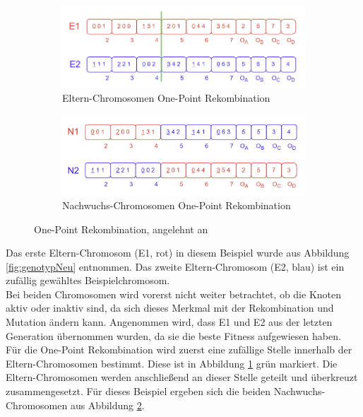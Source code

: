 \begin{figure}[H]
	\centering
	\begin{subfigure}[b]{\textwidth}
		\centering
		\includegraphics[scale = 0.77]{Bilder/BeispielOnePointCrossover.png}
		\caption{Eltern-Chromosomen One-Point Rekombination}
		\label{fig:onePointCrossoverEltern}
	\end{subfigure}
	
	\hfill
	
	\begin{subfigure}[b]{\textwidth}
		\centering
		\includegraphics[scale = 0.55]{Bilder/BeispielOnePointCrossover2.png}
		\caption{Nachwuchs-Chromosomen One-Point Rekombination}
		\label{fig:onePointCrossoverNachwuchs}
	\end{subfigure}
	\caption{One-Point Rekombination, angelehnt an \cite{torabi_using_2022}}
	\label{fig:onePointGesamt}
\end{figure}

Das erste Eltern-Chromosom (E1, rot) in diesem Beispiel wurde aus Abbildung \ref{fig:genotypNeu} entnommen.
Das zweite Eltern-Chromosom (E2, blau) ist ein zufällig gewähltes Beispielchromosom.\\
Bei beiden Chromosomen wird vorerst nicht weiter betrachtet, ob die Knoten aktiv oder inaktiv sind, da sich dieses Merkmal mit der Rekombination und Mutation ändern kann.
Angenommen wird, dass E1 und E2 aus der letzten Generation übernommen wurden, da sie die beste Fitness aufgewiesen haben.\\
Für die One-Point Rekombination wird zuerst eine zufällige Stelle innerhalb der Eltern-Chromosomen bestimmt.
Diese ist in Abbildung \ref{fig:onePointCrossoverEltern} grün markiert.
Die Eltern-Chro\-mo\-so\-men werden anschließend an dieser Stelle geteilt und überkreuzt zusammengesetzt.
Für dieses Beispiel ergeben sich die beiden Nachwuchs-Chromosomen aus Abbildung \ref{fig:onePointCrossoverNachwuchs}.


